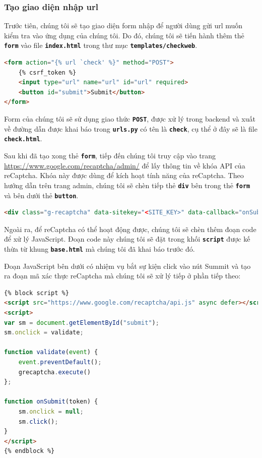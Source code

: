 \subsubsection{Tạo giao diện nhập url}
Trước tiên, chúng tôi sẽ tạo giao diện form nhập để người dùng gửi url muốn kiểm tra vào ứng dụng của chúng tôi. Do đó, chúng tôi sẽ tiến hành thêm thẻ \textbf{\texttt{form}} vào file \textbf{\texttt{index.html}} trong thư mục \textbf{\texttt{templates/checkweb}}.
\begin{lstlisting}[language=html]
<form action="{% url `check' %}" method="POST">
    {% csrf_token %}
    <input type="url" name="url" id="url" required>
    <button id="submit">Submit</button>
</form>
\end{lstlisting}
\par
Form của chúng tôi sẽ sử dụng giao thức \textbf{\texttt{POST}}, được xử lý trong backend và xuất về đường dẫn được khai báo trong \textbf{\texttt{urls.py}} có tên là \textbf{\texttt{check}}, cụ thể ở đây sẽ là file \textbf{\texttt{check.html}}.
\par
Sau khi đã tạo xong thẻ \textbf{\texttt{form}}, tiếp đến chúng tôi truy cập vào trang \url{https://www.google.com/recaptcha/admin/} để lấy thông tin về khóa API của reCaptcha. Khóa này được dùng để kích hoạt tính năng của reCaptcha. Theo hướng dẫn trên trang admin, chúng tôi sẽ chèn tiếp thẻ \textbf{\texttt{div}} bên trong thẻ \textbf{\texttt{form}} và bên dưới thẻ \textbf{\texttt{button}}.
\begin{lstlisting}[language=html]
<div class="g-recaptcha" data-sitekey="<SITE_KEY>" data-callback="onSubmit" data-badge="bottomleft" data-size="invisible"></div>
\end{lstlisting}
\par
Ngoài ra, để reCaptcha có thể hoạt động được, chúng tôi sẽ chèn thêm đoạn code để xử lý JavaScript. Đoạn code này chúng tôi sẽ đặt trong khối \textbf{\texttt{script}} được kế thừa từ khung \textbf{\texttt{base.html}} mà chúng tôi đã khai báo trước đó.
\par
Đoạn JavaScript bên dưới có nhiệm vụ bắt sự kiện click vào nút Summit và tạo ra đoạn mã xác thực reCaptcha mà chúng tôi sẽ xử lý tiếp ở phần tiếp theo:
\begin{lstlisting}[language=html]
{% block script %}
<script src="https://www.google.com/recaptcha/api.js" async defer></script>
<script>
var sm = document.getElementById("submit");
sm.onclick = validate;

function validate(event) {
    event.preventDefault();
    grecaptcha.execute()
};

function onSubmit(token) {
    sm.onclick = null;
    sm.click();
}
</script>
{% endblock %}
\end{lstlisting}
